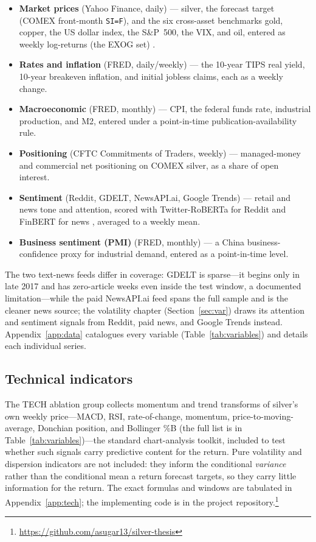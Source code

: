 \documentclass[12pt, a4paper]{article}
\begin{document}
\begin{itemize}[nosep]
    \item \textbf{Market prices} (Yahoo Finance, daily) --- silver, the forecast target
    (COMEX front-month \texttt{SI=F}), and the six cross-asset benchmarks gold, copper, the
    US dollar index, the S\&P~500, the VIX, and oil, entered as weekly log-returns (the EXOG
    set) \parencite{batten2010,zhang2010}.
    \item \textbf{Rates and inflation} (FRED, daily/weekly) --- the 10-year TIPS real yield,
    10-year breakeven inflation, and initial jobless claims, each as a weekly change.
    \item \textbf{Macroeconomic} (FRED, monthly) --- CPI, the federal funds rate, industrial
    production, and M2, entered under a point-in-time publication-availability rule.
    \item \textbf{Positioning} (CFTC Commitments of Traders, weekly) --- managed-money and
    commercial net positioning on COMEX silver, as a share of open interest.
    \item \textbf{Sentiment} (Reddit, GDELT, NewsAPI.ai, Google Trends) --- retail and news
    tone and attention, scored with Twitter-RoBERTa for Reddit \parencite{loureiro2022} and
    FinBERT for news \parencite{araci2019}, averaged to a weekly mean.
    \item \textbf{Business sentiment (PMI)} (FRED, monthly) --- a China business-confidence
    proxy for industrial demand, entered as a point-in-time level.
\end{itemize}

The two text-news feeds differ in coverage: GDELT is sparse---it begins only in late 2017
and has zero-article weeks even inside the test window, a documented limitation---while the
paid NewsAPI.ai feed spans the full sample and is the cleaner news source; the volatility
chapter (Section~\ref{sec:var}) draws its attention and sentiment signals from Reddit, paid
news, and Google Trends instead.
Appendix~\ref{app:data} catalogues every variable (Table~\ref{tab:variables}) and details
each individual series.


\subsection{Technical indicators}

The TECH ablation group collects momentum and trend transforms of silver's own weekly
price---MACD, RSI, rate-of-change, momentum, price-to-moving-average, Donchian position, and
Bollinger \%B (the full list is in Table~\ref{tab:variables})---the standard chart-analysis
toolkit, included to test whether such signals carry predictive content for the return.
Pure volatility and dispersion indicators are not included: they inform the conditional
\emph{variance} rather than the conditional mean a return forecast targets, so they carry
little information for the return. The exact formulas and windows are tabulated in
Appendix~\ref{app:tech}; the implementing code is in the project
repository.\footnote{\url{https://github.com/asugar13/silver-thesis}}
\end{document}
